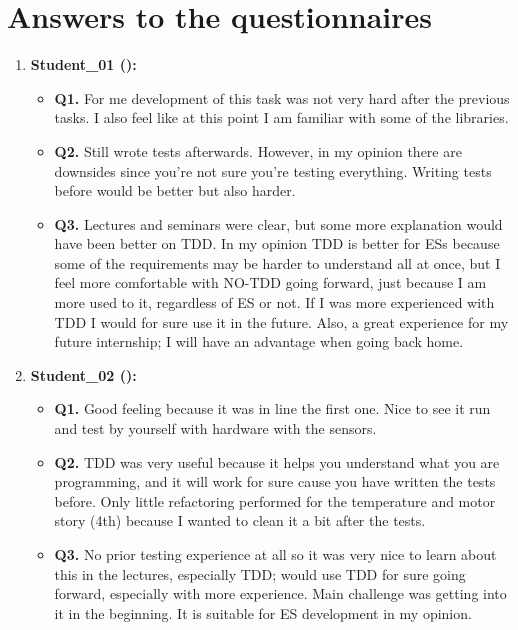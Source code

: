 \section{Answers to the questionnaires}
\begin{enumerate}
    \item \textbf{Student\_01 (\tdd):}
    \begin{itemize}
        \item \textbf{Q1.} For me development of this task was not very hard after the previous tasks. I also feel like at this point I am familiar with some of the libraries.
        \item \textbf{Q2.} Still wrote tests afterwards. However, in my opinion there are downsides since you’re not sure you’re testing everything. Writing tests before would be better but also harder.
        \item \textbf{Q3.} Lectures and seminars were clear, but some more explanation would have been better on TDD. In my opinion TDD is better for ESs because some of the requirements may be harder to understand all at once, but I feel more comfortable with NO-TDD going forward, just because I am more used to it, regardless of ES or not. If I was more experienced with TDD I would for sure use it in the future. Also, a great experience for my future internship; I will have an advantage when going back home.
    \end{itemize}

    \item \textbf{Student\_02 (\tdd):}
    \begin{itemize}
        \item \textbf{Q1.} Good feeling because it was in line the first one. Nice to see it run and test by yourself with hardware with the sensors.
        \item \textbf{Q2.} TDD was very useful because it helps you understand what you are programming, and it will work for sure cause you have written the tests before. Only little refactoring performed for the temperature and motor story (4th) because I wanted to clean it a bit after the tests.
        \item \textbf{Q3.} No prior testing experience at all so it was very nice to learn about this in the lectures, especially TDD; would use TDD for sure going forward, especially with more experience. Main challenge was getting into it in the beginning. It is suitable for ES development in my opinion.
    \end{itemize}


\end{enumerate}
